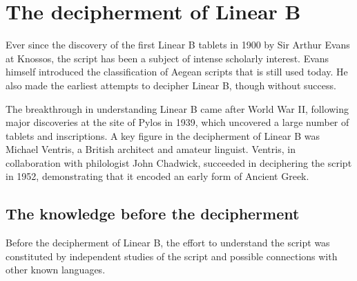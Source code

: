 \section{The decipherment of Linear B}
Ever since the discovery of the first Linear B tablets in 1900 by Sir Arthur Evans at Knossos, the script has been a subject of intense scholarly interest.
Evans himself introduced the classification of Aegean scripts that is still used today.
He also made the earliest attempts to decipher Linear B, though without success.

The breakthrough in understanding Linear B came after World War II, following major discoveries at the site of Pylos in 1939, which uncovered a large number of tablets and inscriptions.
A key figure in the decipherment of Linear B was Michael Ventris, a British architect and amateur linguist.
Ventris, in collaboration with philologist John Chadwick, succeeded in deciphering the script in 1952, demonstrating that it encoded an early form of Ancient Greek.

\subsection{The knowledge before the decipherment}
Before the decipherment of Linear B, the effort to understand the script was constituted by independent studies of the script and possible connections with other known languages.
